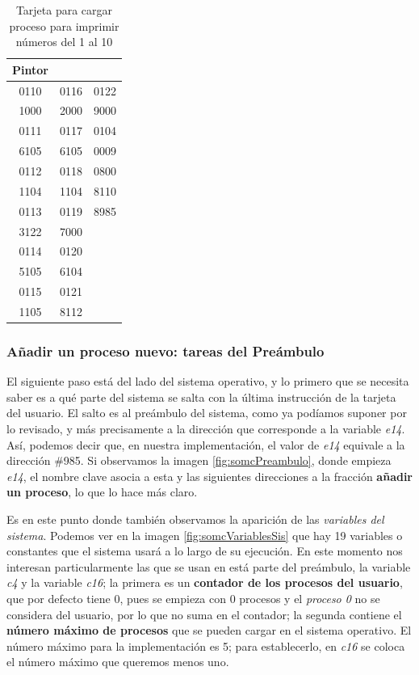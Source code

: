 \documentclass[letterpaper,12pt,oneside]{book}
\begin{document}
		
		
		
			\begin{table}[h]
			  \centering
			  \begin{tabular}{|c|c|c|}
			  \hline
				\textbf{Pintor}\\
			  \hline
			    0110	&	0116	&	0122	\\
				1000	&	2000	&	9000	\\
				0111	&	0117	&	0104	\\
				6105	&	6105	&	0009	\\
				0112	&	0118	&	0800	\\
				1104	&	1104	&	8110	\\
				0113	&	0119	&	8985	\\
				3122	&	7000	&		\\
				0114	&	0120	&		\\
				5105	&	6104	&		\\
				0115	&	0121	&		\\
				1105	&	8112	&		\\
				\hline
			  \end{tabular}
			  \caption{Tarjeta para cargar proceso para imprimir números del 1 al 10}
			  \label{tab:tarjetaContador1a10}
			\end{table}

            \subsubsection{Añadir un proceso nuevo: tareas del Preámbulo}
			
			El siguiente paso está del lado del sistema operativo, y lo primero que se necesita saber es a qué parte del sistema se salta con
			la última instrucción de la tarjeta del usuario. El
			salto es al preámbulo del sistema, como ya podíamos suponer por lo revisado, y más precisamente a la dirección que corresponde a la variable
			\textit{e14}. Así, podemos decir que, en nuestra implementación, el valor de \textit{e14} equivale a la dirección \#985. Si observamos la 
			imagen
			\ref{fig:somcPreambulo}, donde empieza \textit{e14}, el nombre clave asocia a esta y las siguientes direcciones a la
			fracción \textbf{añadir un proceso}, lo que lo hace más claro. 
			
			Es en este punto donde también observamos la aparición de las \textit{variables del 
			sistema}. Podemos ver en la imagen \ref{fig:somcVariablesSis} que hay 19 variables o constantes que el sistema usará a lo largo
			de su ejecución. En este momento nos interesan particularmente las que se usan en está parte del preámbulo,
			la variable \textit{c4} y la variable \textit{c16}; la primera es un \textbf{contador de los 
			procesos del usuario}, que por defecto tiene 0, pues se empieza con 0 procesos y el \textit{proceso 0} no se considera
			del usuario, por lo que no suma en el contador; la segunda contiene el \textbf{número máximo
			de procesos} que se pueden cargar en el sistema operativo. El número máximo para la implementación es 5; para establecerlo, en
            \textit{c16} se coloca el número máximo que queremos menos uno.
   
\end{document}

